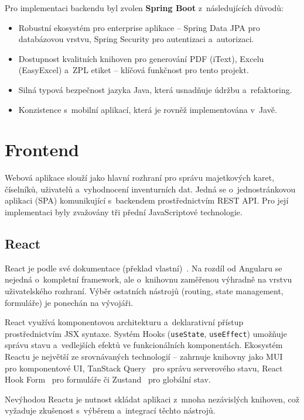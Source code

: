 Pro implementaci backendu byl zvolen \textbf{Spring Boot} z~následujících důvodů:
\begin{itemize}
	\item Robustní ekosystém pro enterprise aplikace -- Spring Data JPA pro databázovou vrstvu, Spring Security pro autentizaci a~autorizaci.
	\item Dostupnost kvalitních knihoven pro generování PDF (iText), Excelu (EasyExcel) a~ZPL etiket -- klíčová funkčnost pro tento projekt.
	\item Silná typová bezpečnost jazyka Java, která usnadňuje údržbu a~refaktoring.
	\item Konzistence s~mobilní aplikací, která je rovněž implementována v~Javě.
\end{itemize}


\section{Frontend}

Webová aplikace slouží jako hlavní rozhraní pro správu majetkových karet, číselníků, uživatelů a~vyhodnocení inventurních dat. Jedná se o~jednostránkovou aplikaci (SPA) komunikující s~backendem prostřednictvím REST API. Pro její implementaci byly zvažovány tři přední JavaScriptové technologie.

\subsection{React}

React je podle své dokumentace  (překlad vlastní)~\cite{react}. Na rozdíl od Angularu se nejedná o~kompletní framework, ale o~knihovnu zaměřenou výhradně na vrstvu uživatelského rozhraní. Výběr ostatních nástrojů (routing, state management, formuláře) je ponechán na vývojáři.

React využívá komponentovou architekturu a~deklarativní přístup prostřednictvím JSX syntaxe. Systém Hooks (\texttt{useState}, \texttt{useEffect}) umožňuje správu stavu a~vedlejších efektů ve funkcionálních komponentách. Ekosystém Reactu je největší ze srovnávaných technologií -- zahrnuje knihovny jako MUI~\cite{mui} pro komponentové UI, TanStack Query~\cite{tanstackquery} pro správu serverového stavu, React Hook Form~\cite{reacthookform} pro formuláře či Zustand~\cite{zustand} pro globální stav.

Nevýhodou Reactu je nutnost skládat aplikaci z~mnoha nezávislých knihoven, což vyžaduje zkušenost s~výběrem a~integrací těchto nástrojů.

